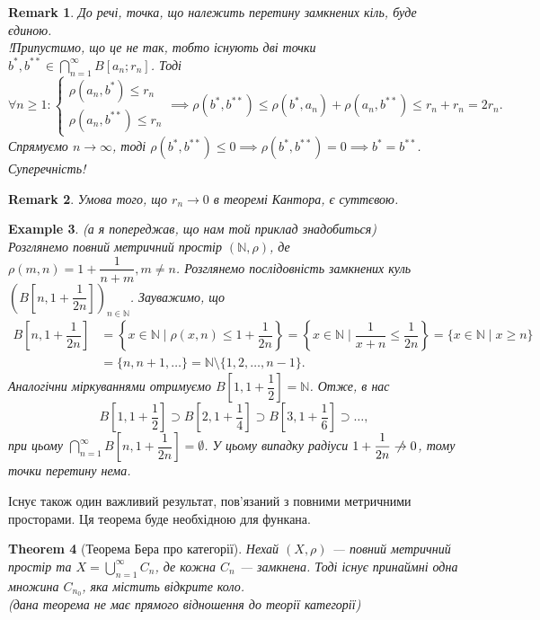 \documentclass[a4paper, 10pt]{article}
\theoremstyle{theoremdd}
\newtheorem{theorem}{Theorem}[subsection]
\theoremstyle{theoremdd}
\theoremstyle{theoremdd}
\theoremstyle{theoremdd}
\newtheorem{example}[theorem]{Example}
\theoremstyle{theoremdd}
\theoremstyle{theoremdd}
\newtheorem{remark}[theorem]{Remark}
\theoremstyle{theoremdd}
\theoremstyle{theoremdd}
\begin{document}
\begin{remark}
До речі, точка, що належить перетину замкнених кіль, буде єдиною.\\
!Припустимо, що це не так, тобто існують дві точки $b^*, b^{**} \in \displaystyle \bigcap_{n=1}^\infty B[a_n;r_n]$. Тоді 
\[
\forall n \geq 1: \begin{cases} \rho(a_n, b^*) \leq r_n \\ \rho(a_n, b^{**}) \leq r_n \end{cases} \implies \rho(b^*, b^{**}) \leq \rho(b^*,a_n) + \rho(a_n, b^{**}) \leq r_n + r_n = 2r_n.
\]
Спрямуємо $n \to \infty$, тоді $\rho(b^*,b^{**}) \leq 0 \implies \rho(b^*,b^{**}) = 0 \implies b^{*} = b^{**}$. Суперечність!
\end{remark}

\begin{remark}
Умова того, що $r_n \to 0$ в теоремі Кантора, є суттєвою.
\end{remark}

\begin{example}
(\textit{а я попереджав, що нам той приклад знадобиться})\\
Розглянемо повний метричний простір $(\mathbb{N}, \rho)$, де $\rho(m,n) = 1 +\dfrac{1}{n+m},m \neq n$. Розглянемо послідовність замкнених куль $\left( B\left[ n, 1 + \dfrac{1}{2n}\right] \right)_{n \in \mathbb{N}}$. Зауважимо, що
\begin{align*}
B\left[n, 1 + \dfrac{1}{2n} \right] & = \left\{x \in \mathbb{N} \mid \rho(x,n) \leq 1 + \dfrac{1}{2n} \right\} = \left\{ x \in \mathbb{N} \mid \dfrac{1}{x+n} \leq \dfrac{1}{2n} \right\} = \{x \in \mathbb{N} \mid x \geq n\} \\
& = \{n,n+1,\dots\} = \mathbb{N} \setminus \{1,2,\dots,n-1\}.
\end{align*}
Аналогічни міркуваннями отримуємо $B\left[ 1, 1 + \dfrac{1}{2}\right] = \mathbb{N}$. Отже, в нас
\[
B\left[1, 1 + \dfrac{1}{2}\right] \supset B\left[ 2, 1 + \dfrac{1}{4} \right] \supset B\left[3, 1 + \dfrac{1}{6}\right] \supset \dots,
\]
при цьому $\displaystyle\bigcap_{n=1}^\infty B\left[n, 1 + \dfrac{1}{2n}\right] = \emptyset$. У цьому випадку радіуси $1 + \dfrac{1}{2n} \centernot\to 0$, тому точки перетину нема.
\end{example}

\noindent
Існує також один важливий результат, пов'язаний з повними метричними просторами. Ця теорема буде необхідною для функана.

\begin{theorem}[Теорема Бера про категорії]
Нехай $(X,\rho)$ --- повний метричний простір та $X = \displaystyle\bigcup_{n =1}^\infty C_n$, де кожна $C_n$ --- замкнена. Тоді існує принаймні одна множина $C_{n_0}$, яка містить відкрите коло.\\
\textit{(дана теорема не має прямого відношення до теорії категорії)}
\end{theorem}
\end{document}
